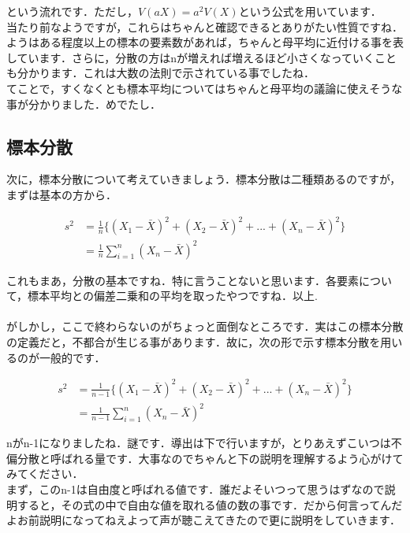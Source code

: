 \documentclass[11pt,a4paper,uplatex]{ujreport} 	%
\begin{document}
という流れです．ただし，$V(aX) = a^2 V(X)$という公式を用いています．\\



当たり前なようですが，これらはちゃんと確認できるとありがたい性質ですね．ようはある程度以上の標本の要素数があれば，ちゃんと母平均に近付ける事を表しています．さらに，分散の方はnが増えれば増えるほど小さくなっていくことも分かります．これは大数の法則で示されている事でしたね．\\

てことで，すくなくとも標本平均についてはちゃんと母平均の議論に使えそうな事が分かりました．めでたし．



\subsection{標本分散}
次に，標本分散について考えていきましょう．標本分散は二種類あるのですが，まずは基本の方から．

\begin{align}
  s^2 &= \frac{1}{n}\{ (X_1-\bar{X})^2 + (X_2-\bar{X})^2 + ...+(X_n - \bar{X})^2 \}\\
      &= \frac{1}{n} \sum_{i=1}^n(X_n - \bar{X})^2
      \label{eq:hyohonvar}
\end{align}

これもまあ，分散の基本ですね．特に言うことないと思います．各要素について，標本平均との偏差二乗和の平均を取ったやつですね．以上.\\
\\

がしかし，ここで終わらないのがちょっと面倒なところです．実はこの標本分散の定義だと，不都合が生じる事があります．故に，次の形で示す標本分散を用いるのが一般的です．

\begin{align}
  s^2 &= \frac{1}{n-1}\{ (X_1-\bar{X})^2 + (X_2-\bar{X})^2 + ...+(X_n - \bar{X})^2 \}\\
      &= \frac{1}{n-1} \sum_{i=1}^n(X_n - \bar{X})^2
\end{align}

nがn-1になりましたね．謎です．導出は下で行いますが，とりあえずこいつは不偏分散と呼ばれる量です．大事なのでちゃんと下の説明を理解するよう心がけてみてください．\\

まず，このn-1は自由度と呼ばれる値です．誰だよそいつって思うはずなので説明すると，その式の中で自由な値を取れる値の数の事です．だから何言ってんだよお前説明になってねえよって声が聴こえてきたので更に説明をしていきます．\\
\end{document}
